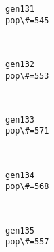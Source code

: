 \documentclass[11pt]{article}
\begin{document}
    \begin{Verbatim}[commandchars=\\\{\}]
gen131
pop\#=545

    \end{Verbatim}

    \begin{center}
    \end{center}
    { \hspace*{\fill} \\}
    
    \begin{Verbatim}[commandchars=\\\{\}]
gen132
pop\#=553

    \end{Verbatim}

    \begin{center}
    \end{center}
    { \hspace*{\fill} \\}
    
    \begin{Verbatim}[commandchars=\\\{\}]
gen133
pop\#=571

    \end{Verbatim}

    \begin{center}
    \end{center}
    { \hspace*{\fill} \\}
    
    \begin{Verbatim}[commandchars=\\\{\}]
gen134
pop\#=568

    \end{Verbatim}

    \begin{center}
    \end{center}
    { \hspace*{\fill} \\}
    
    \begin{Verbatim}[commandchars=\\\{\}]
gen135
pop\#=557

    \end{Verbatim}
\end{document}
